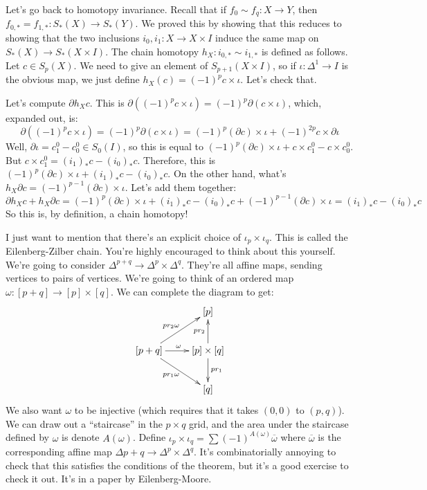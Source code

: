 \documentclass{amsart}
\theoremstyle{theorem}
\theoremstyle{definition}
\begin{document}
Let's go back to homotopy invariance. Recall that if $f_0\sim f_q:X\to Y$, then $f_{0,\ast}=f_{1,\ast}:S_\ast(X)\to S_\ast(Y)$. We proved this by showing that this reduces to showing that the two inclusions $i_0,i_1:X\to X\times I$ induce the same map on $S_\ast(X)\to S_\ast(X\times I)$. The chain homotopy $h_X:i_{0,\ast}\sim i_{1,\ast}$ is defined as follows. Let $c\in S_p(X)$. We need to give an element of $S_{p+1}(X\times I)$, so if $\iota:\Delta^1\to I$ is the obvious map, we just define $h_X(c)=(-1)^p c\times\iota$. Let's check that.

Let's compute $\partial h_Xc$. This is $\partial((-1)^p c\times \iota)=(-1)^p\partial(c\times\iota)$, which, expanded out, is:
	\begin{equation*}
	\partial((-1)^p c\times \iota)=(-1)^p\partial(c\times\iota)=(-1)^p(\partial c)\times\iota+(-1)^{2p}c\times\partial\iota
	\end{equation*}
Well, $\partial\iota=c_1^0-c_0^0\in S_0(I)$, so this is equal to $(-1)^p(\partial c)\times\iota+c\times c^0_1 - c\times c_0^0$. But $c\times c^0_1=(i_1)_\ast c-(i_0)_\ast c$. Therefore, this is $(-1)^p(\partial c)\times\iota + (i_1)_\ast c-(i_0)_\ast c$. On the other hand, what's $h_X\partial c=(-1)^{p-1}(\partial c)\times\iota$. Let's add them together:
	\begin{equation*}
	\partial h_Xc+h_X\partial c=(-1)^p(\partial c)\times\iota + (i_1)_\ast c-(i_0)_\ast c+(-1)^{p-1}(\partial c)\times\iota=(i_1)_\ast c - (i_0)_\ast c
	\end{equation*}
So this is, by definition, a chain homotopy!

I just want to mention that there's an explicit choice of $\iota_p\times\iota_q$. This is called the Eilenberg-Zilber chain. You're highly encouraged to think about this yourself. We're going to consider $\Delta^{p+q}\to\Delta^p\times\Delta^q$. They're all affine maps, sending vertices to pairs of vertices. We're going to think of an ordered map $\omega:[p+q]\to[p]\times[q]$. We can complete the diagram to get:
	\begin{equation*}
	\xymatrix{ & [p]\\
	[p+q]\ar[ur]^{pr_2\omega}\ar[dr]_{pr_1\omega}\ar[r]^\omega & [p]\times[q]\ar[u]^{pr_2}\ar[d]^{pr_1}\\
	 & [q]}
	\end{equation*}
We also want $\omega$ to be injective (which requires that it takes $(0,0)$ to $(p,q)$). We can draw out a ``staircase'' in the $p\times q$ grid, and the area under the staircase defined by $\omega$ is denote $A(\omega)$. Define $\iota_p\times\iota_q=\sum(-1)^{A(\omega)}\overline{\omega}$ where $\overline{\omega}$ is the corresponding affine map $\Delta{p+q}\to\Delta^p\times\Delta^q$. It's combinatorially annoying to check that this satisfies the conditions of the theorem, but it's a good exercise to check it out. It's in a paper by Eilenberg-Moore.
\end{document}
